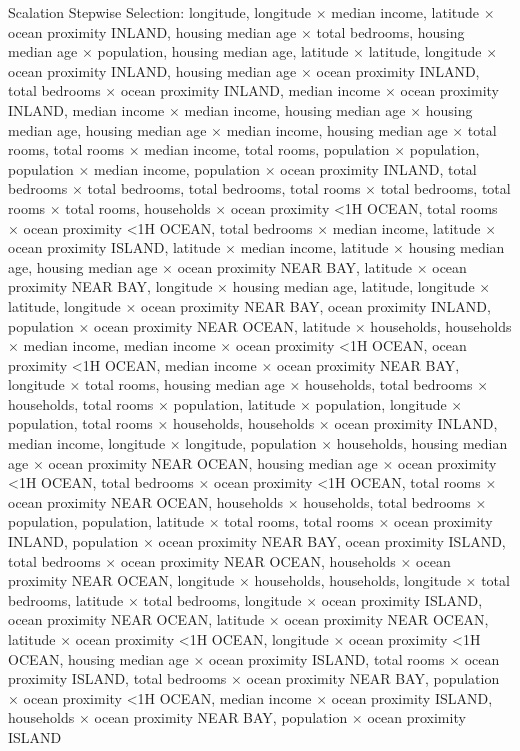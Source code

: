 \documentclass{article}
\begin{document}
Scalation Stepwise Selection: longitude, longitude $\times$ median income, latitude $\times$ ocean proximity INLAND, housing median age $\times$ total bedrooms, housing median age $\times$ population, housing median age, latitude $\times$ latitude, longitude $\times$ ocean proximity INLAND, housing median age $\times$ ocean proximity INLAND, total bedrooms $\times$ ocean proximity INLAND, median income $\times$ ocean proximity INLAND, median income $\times$ median income, housing median age $\times$ housing median age, housing median age $\times$ median income, housing median age $\times$ total rooms, total rooms $\times$ median income, total rooms, population $\times$ population, population $\times$ median income, population $\times$ ocean proximity INLAND, total bedrooms $\times$ total bedrooms, total bedrooms, total rooms $\times$ total bedrooms, total rooms $\times$ total rooms, households $\times$ ocean proximity <1H OCEAN, total rooms $\times$ ocean proximity <1H OCEAN, total bedrooms $\times$ median income, latitude $\times$ ocean proximity ISLAND, latitude $\times$ median income, latitude $\times$ housing median age, housing median age $\times$ ocean proximity NEAR BAY, latitude $\times$ ocean proximity NEAR BAY, longitude $\times$ housing median age, latitude, longitude $\times$ latitude, longitude $\times$ ocean proximity NEAR BAY, ocean proximity INLAND, population $\times$ ocean proximity NEAR OCEAN, latitude $\times$ households, households $\times$ median income, median income $\times$ ocean proximity <1H OCEAN, ocean proximity <1H OCEAN, median income $\times$ ocean proximity NEAR BAY, longitude $\times$ total rooms, housing median age $\times$ households, total bedrooms $\times$ households, total rooms $\times$ population, latitude $\times$ population, longitude $\times$ population, total rooms $\times$ households, households $\times$ ocean proximity INLAND, median income, longitude $\times$ longitude, population $\times$ households, housing median age $\times$ ocean proximity NEAR OCEAN, housing median age $\times$ ocean proximity <1H OCEAN, total bedrooms $\times$ ocean proximity <1H OCEAN, total rooms $\times$ ocean proximity NEAR OCEAN, households $\times$ households, total bedrooms $\times$ population, population, latitude $\times$ total rooms, total rooms $\times$ ocean proximity INLAND, population $\times$ ocean proximity NEAR BAY, ocean proximity ISLAND, total bedrooms $\times$ ocean proximity NEAR OCEAN, households $\times$ ocean proximity NEAR OCEAN, longitude $\times$ households, households, longitude $\times$ total bedrooms, latitude $\times$ total bedrooms, longitude $\times$ ocean proximity ISLAND, ocean proximity NEAR OCEAN, latitude $\times$ ocean proximity NEAR OCEAN, latitude $\times$ ocean proximity <1H OCEAN, longitude $\times$ ocean proximity <1H OCEAN, housing median age $\times$ ocean proximity ISLAND, total rooms $\times$ ocean proximity ISLAND, total bedrooms $\times$ ocean proximity NEAR BAY, population $\times$ ocean proximity <1H OCEAN, median income $\times$ ocean proximity ISLAND, households $\times$ ocean proximity NEAR BAY, population $\times$ ocean proximity ISLAND
\end{document}
